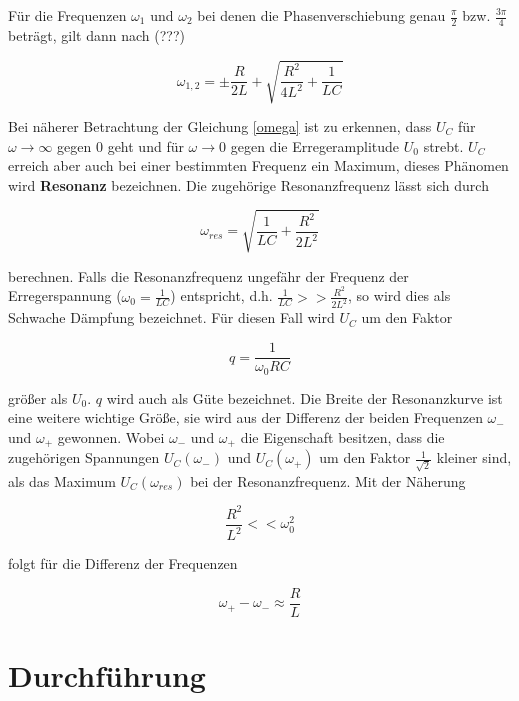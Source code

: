 Für die Frequenzen $\omega_1$ und $\omega_2$ bei denen die Phasenverschiebung genau $\frac{\pi}{2}$ bzw. $\frac{3 \pi}{4}$
beträgt, gilt dann nach (???)

\begin{equation*}
  \omega_{1,2} = \pm \frac{R}{2L} + \sqrt{\frac{R^2}{4L^2} + \frac{1}{LC}}
\end{equation*}

Bei näherer Betrachtung der Gleichung \eqref{omega} ist zu erkennen, dass $U_C$ für $\omega \to \infty$ gegen 0 geht
und für $\omega \to 0$ gegen die Erregeramplitude $U_0$ strebt. $U_C$ erreich aber auch bei einer bestimmten Frequenz
ein Maximum, dieses Phänomen wird \textbf{Resonanz} bezeichnen. Die zugehörige Resonanzfrequenz lässt sich durch

\begin{equation*}
  \omega_{res} = \sqrt{\frac{1}{LC} + \frac{R^2}{2L^2}}
\end{equation*}

berechnen. Falls die Resonanzfrequenz ungefähr der Frequenz der Erregerspannung ($\omega_0 = \frac{1}{LC}$) entspricht, d.h.
$ \frac{1}{LC} >> \frac{R^2}{2L^2} $, so wird dies als Schwache Dämpfung bezeichnet. Für diesen Fall wird $U_C$ um
den Faktor

\begin{equation*}
  q = \frac{1}{\omega_0 RC}
\end{equation*}

 größer als $U_0$. $q$ wird auch als Güte bezeichnet. Die Breite der Resonanzkurve ist eine weitere wichtige Größe,
 sie wird aus der Differenz der beiden Frequenzen $\omega_-$ und $\omega_+$ gewonnen. Wobei $\omega_-$ und $\omega_+$
 die Eigenschaft besitzen, dass die zugehörigen Spannungen $U_C(\omega_-)$ und $U_C(\omega_+)$  um den Faktor
 $\frac{1}{\sqrt{2}}$ kleiner sind, als das Maximum $U_C(\omega_{res})$ bei der Resonanzfrequenz.
 Mit der Näherung

 \begin{equation*}
   \frac{R^2}{L^2} << \omega_0^2
 \end{equation*}

folgt für die Differenz der Frequenzen

\begin{equation*}
\omega_+ - \omega_- \approx \frac{R}{L}
\end{equation*}

 \section{Durchführung}

